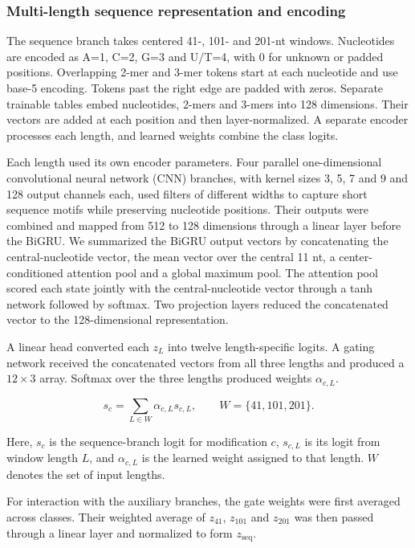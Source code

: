 \documentclass[unnumsec,webpdf,contemporary,large]{oup-authoring-template}
\begin{document}
\subsubsection{Multi-length sequence representation and encoding}

The sequence branch takes centered 41-, 101- and 201-nt windows. Nucleotides are encoded as A=1, C=2, G=3 and U/T=4, with 0 for unknown or padded positions. Overlapping 2-mer and 3-mer tokens start at each nucleotide and use base-5 encoding. Tokens past the right edge are padded with zeros. Separate trainable tables embed nucleotides, 2-mers and 3-mers into 128 dimensions. Their vectors are added at each position and then layer-normalized. A separate encoder processes each length, and learned weights combine the class logits.

Each length used its own encoder parameters. Four parallel one-dimensional convolutional neural network (CNN) branches, with kernel sizes 3, 5, 7 and 9 and 128 output channels each, used filters of different widths to capture short sequence motifs while preserving nucleotide positions. Their outputs were combined and mapped from 512 to 128 dimensions through a linear layer before the BiGRU. We summarized the BiGRU output vectors by concatenating the central-nucleotide vector, the mean vector over the central 11 nt, a center-conditioned attention pool and a global maximum pool. The attention pool scored each state jointly with the central-nucleotide vector through a tanh network followed by softmax. Two projection layers reduced the concatenated vector to the 128-dimensional representation.

A linear head converted each $z_L$ into twelve length-specific logits. A gating network received the concatenated vectors from all three lengths and produced a $12\times3$ array. Softmax over the three lengths produced weights $\alpha_{c,L}$.

\begin{equation}
s_c = \sum_{L\in W}\alpha_{c,L}s_{c,L},\qquad W=\{41,101,201\}.
\end{equation}

Here, $s_c$ is the sequence-branch logit for modification $c$, $s_{c,L}$ is its logit from window length $L$, and $\alpha_{c,L}$ is the learned weight assigned to that length. $W$ denotes the set of input lengths.

For interaction with the auxiliary branches, the gate weights were first averaged across classes. Their weighted average of $z_{41}$, $z_{101}$ and $z_{201}$ was then passed through a linear layer and normalized to form $z_{\mathrm{seq}}$.
\end{document}

